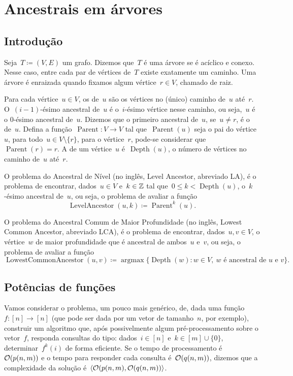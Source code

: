 \documentclass[main.tex]{subfiles}
\newcommand{\Par}{\operatorname{Parent}}
\newcommand{\LA}{\operatorname{LevelAncestor}}
\newcommand{\Dep}{\operatorname{Depth}}
\newcommand{\LCA}{\operatorname{LowestCommonAncestor}}
\newcommand{\argmax}{\operatorname{argmax}}
\begin{document}
\chapter{Ancestrais em árvores} \label{cap:ancestrais}

\section{Introdução}

Seja~$T \coloneqq (V, E)$ um grafo. Dizemos que~$T$ é uma árvore se é acíclico e conexo. Nesse caso, entre cada par de vértices de~$T$ existe exatamente um caminho. Uma árvore é enraizada quando fixamos algum vértice~${r \in V}$, chamado de raiz.


Para cada vértice~${u \in V}$, os  de~$u$ são os vértices no (único) caminho de~$u$ até~$r$. O~$(i-1)$-ésimo ancestral de~$u$ é o~$i$-ésimo vértice nesse caminho, ou seja,~$u$ é o $0$-ésimo ancestral de~$u$. Dizemos que o primeiro ancestral de~$u$, se~$u \neq r$, é o  de~$u$. Defina a função~${\Par: V \rightarrow V}$ tal que~$\Par(u)$ seja o pai do vértice~$u$, para todo~$u \in V \setminus \{r\}$, para o vértice~$r$, pode-se considerar que~$\Par(r) = r$. A  de um vértice~$u$ é~$\Dep(u)$, o número de vértices no caminho de~$u$ até~$r$.

O problema do Ancestral de Nível (no inglês, Level Ancestor, abreviado LA), é o problema de encontrar, dados~$u \in V$ e~$k \in \mathbb{Z}$ tal que~$0 \leq k < \Dep(u)$, o~$k$-ésimo ancestral de~$u$, ou seja, o problema de avaliar a função
$$\LA(u, k) \coloneqq \Par^k(u). $$

O problema do Ancestral Comum de Maior Profundidade (no inglês, Lowest Common Ancestor, abreviado LCA), é o problema de encontrar, dados~$u, v \in V$, o vértice~$w$ de maior profundidade que é ancestral de ambos~$u$ e~$v$, ou seja, o problema de avaliar a função
$$\LCA(u, v) \coloneqq \argmax\{\Dep(w) : w \in V,\ w \text{ é ancestral de $u$ e $v$}\}. $$

\section{Potências de funções}

Vamos considerar o problema, um pouco mais genérico, de, dada uma função~$f : [n] \rightarrow [n]$ (que pode ser dada por um vetor de tamanho~$n$, por exemplo), construir um algoritmo que, após possivelmente algum pré-processamento sobre o vetor~$f$, responda consultas do tipo: dados~$i \in [n]$ e~$k \in [m] \cup \{0\}$, determinar~$f^k(i)$ de forma eficiente. Se o tempo de processamento é~$\mathcal{O}(p(n, m))$ e o tempo para responder cada consulta é~$\mathcal{O}(q(n, m))$, dizemos que a complexidade da solução é~$\langle\mathcal{O}(p(n, m), \mathcal{O}(q(n, m))\rangle$.
\end{document}
